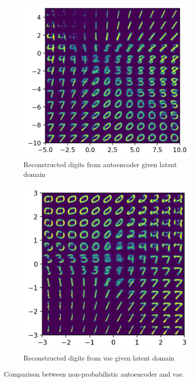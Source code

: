 \documentclass[11pt, a4paper]{article}
\begin{document}
\begin{figure}[H]
\begin{subfigure}[b]{0.49\textwidth}
			\centering
			\includegraphics[width=\textwidth]{imgs/relatedwork/ae-synth}
			\caption{Reconstructed digits from autoencoder given latent domain}
			\label{fig:five over x}
		\end{subfigure}
		\hfill
		\begin{subfigure}[b]{0.46\textwidth}
			\centering
			\includegraphics[width=\textwidth]{imgs/relatedwork/vae-synth}
			\caption{Reconstructed digits from \gls{vae} given latent domain}
			\label{fig:five over x}
		\end{subfigure}
		\caption{Comparison between non-probabilistic autoencoder and \gls{vae}.}
		\label{fig:three graphs}
	\end{figure}
\end{document}
